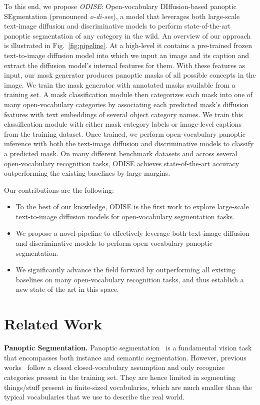 \documentclass[10pt,twocolumn,letterpaper]{article}
\newcommand{\ourmethod}{ODISE}
\begin{document}
To this end, we propose \textit{\ourmethod{}}: Open-vocabulary DIffusion-based panoptic SEgmentation (pronounced \emph{o-di-see}), a model that leverages both large-scale text-image diffusion and discriminative models to perform state-of-the-art panoptic segmentation of any category in the wild. An overview of our approach is illustrated in Fig.~\ref{fig:pipeline}. At a high-level it contains a pre-trained frozen text-to-image diffusion model into which we input an image and its caption and extract the diffusion model's internal features for them. With these features as input, our mask generator produces panoptic masks of all possible concepts in the image. We train the mask generator with annotated masks available from a training set. A mask classification module then categorizes each mask into one of many open-vocabulary categories by associating each predicted mask's diffusion features with text embeddings of several object category names. We train this classification module with either mask category labels or image-level captions from the training dataset.
Once trained, we perform open-vocabulary panoptic inference with both the text-image diffusion and discriminative models to classify a predicted mask. On many different benchmark datasets and across several open-vocabulary recognition tasks, \ourmethod{} achieves state-of-the-art accuracy outperforming the existing baselines by large margins.

Our contributions are the following:
\begin{itemize}[noitemsep,nosep]
\item To the best of our knowledge, \ourmethod{} is the first work to explore large-scale text-to-image diffusion models for open-vocabulary segmentation tasks.
\item We propose a novel pipeline to effectively leverage both text-image diffusion and discriminative models to perform open-vocabulary panoptic segmentation. 
\item We significantly advance the field forward by outperforming all existing baselines on many open-vocabulary recognition tasks, and thus establish a new state of the art in this space.
\end{itemize}

\section{Related Work}

\textbf{Panoptic Segmentation.}
Panoptic segmentation~\cite{kirillov2019panoptic} is a fundamental vision task that encompasses both instance and semantic segmentation. However, previous works~\cite{cheng2022mask2former, cheng2020panopticdeeplab, kirillov2019panoptic, wang2021maxdeeplab, carion2020detr,li2022maskdino, yu2022kmeansmaskformer,li2022panopticsegformer,zhang2021knet, cheng2021maskformer, ren2021refine,li2021panopticfcn} follow a closed closed-vocabulary assumption and only recognize categories present in the training set. They are hence limited in segmenting things/stuff present in finite-sized vocabularies, which are much smaller than the typical vocabularies that we use to describe the real world. 
\end{document}
